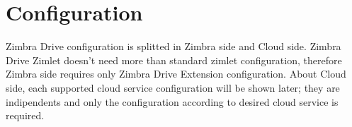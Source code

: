\chapter{Configuration}\label{==cha:configuration==}

Zimbra Drive configuration is splitted in Zimbra side and Cloud side.
Zimbra Drive Zimlet doesn't need more than standard zimlet configuration,
therefore Zimbra side requires only Zimbra Drive Extension configuration.
About Cloud side, each supported cloud service configuration will be shown later;
they are indipendents and only the configuration according to desired cloud service is required.




